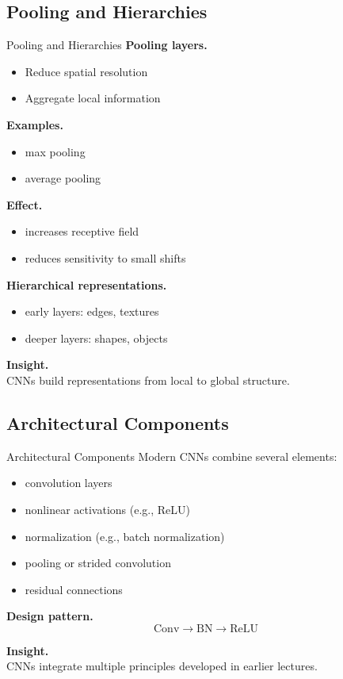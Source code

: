 \documentclass[aspectratio=169,11pt]{beamer}
\begin{document}
\subsection{Pooling and Hierarchies}
\begin{frame}[t,allowframebreaks]{Pooling and Hierarchies}
\small
\textbf{Pooling layers.}\\ \begin{itemize}
    \item Reduce spatial resolution
    \item Aggregate local information
\end{itemize}

\textbf{Examples.}\\ \begin{itemize}
    \item max pooling
    \item average pooling
\end{itemize}

\textbf{Effect.}\\ \begin{itemize}
    \item increases receptive field
    \item reduces sensitivity to small shifts
\end{itemize}

\textbf{Hierarchical representations.}\\ \begin{itemize}
    \item early layers: edges, textures
    \item deeper layers: shapes, objects
\end{itemize}

\textbf{Insight.}\\ CNNs build representations from local to global structure.
\end{frame}

\subsection{Architectural Components}
\begin{frame}[t,allowframebreaks]{Architectural Components}
\small
Modern CNNs combine several elements:

\begin{itemize}
    \item convolution layers
    \item nonlinear activations (e.g., ReLU)
    \item normalization (e.g., batch normalization)
    \item pooling or strided convolution
    \item residual connections
\end{itemize}

\textbf{Design pattern.}\\ \[
\text{Conv} \rightarrow \text{BN} \rightarrow \text{ReLU}
\]

\textbf{Insight.}\\ CNNs integrate multiple principles developed in earlier lectures.
\end{frame}
\end{document}
